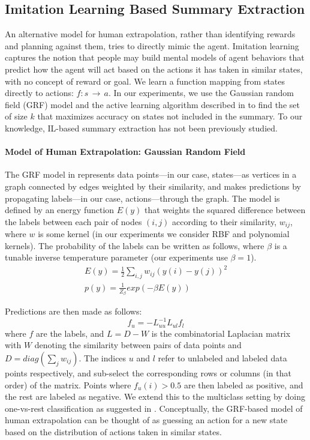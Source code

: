 \documentclass{article}
\begin{document}
\subsection{Imitation Learning Based Summary Extraction}
An alternative model for human extrapolation, rather than identifying rewards and planning against them, tries to directly mimic the agent. Imitation learning captures the notion that people may build mental models of agent behaviors that predict how the agent will act based on the actions it has taken in similar states, with no concept of reward or goal. We learn a function mapping from states directly to actions: $f: s\,\to\,a$. In our experiments, we use the Gaussian random field (GRF) model and the active learning algorithm described in \cite{zhu2003} to find the set of size $k$ that maximizes accuracy on states not included in the summary. To our knowledge, IL-based summary extraction has not been previously studied.

\paragraph{Model of Human Extrapolation: Gaussian Random Field}
The GRF model in \cite{zhu2003} represents data points---in our case, states---as vertices in a graph connected by edges weighted by their similarity, and makes predictions by propagating labels---in our case, actions---through the graph. The model is defined by an energy function $E(y)$ that weights the squared difference between the labels between each pair of nodes $(i, j)$ according to their similarity, $w_{ij}$, where $w$ is some kernel (in our experiments we consider RBF and polynomial kernels). 
The probability of the labels can be written as follows, where $\beta$ is a tunable inverse temperature parameter (our experiments use $\beta=1$). 
\begin{eqnarray*}\label{eq_energy}
E(y) = \frac{1}{2} \sum_{i,j} w_{ij} (y(i) - y(j))^2\\
p(y) = \frac{1}{Z_\beta}exp(-\beta E(y))
\end{eqnarray*}

Predictions are then made as follows: 
\begin{equation}\label{eq_GRFmean}
f_u = - L_{uu}^{-1} L_{ul} f_l
\end{equation}
where $f$ are the labels, and $L = D - W$ is the combinatorial Laplacian matrix with $W$ denoting the similarity between pairs of data points and $D = diag(\sum_j w_{ij})$. The indices $u$ and $l$ refer to unlabeled and labeled data points respectively, and sub-select the corresponding rows or columns (in that order) of the matrix. Points where $f_u(i) > 0.5$ are then labeled as positive, and the rest are labeled as negative. We extend this to the multiclass setting by doing one-vs-rest classification as suggested in \cite{zhu2003semisupervised}. Conceptually, the GRF-based model of human extrapolation can be thought of as guessing an action for a new state based on the distribution of actions taken in similar states.
\end{document}
